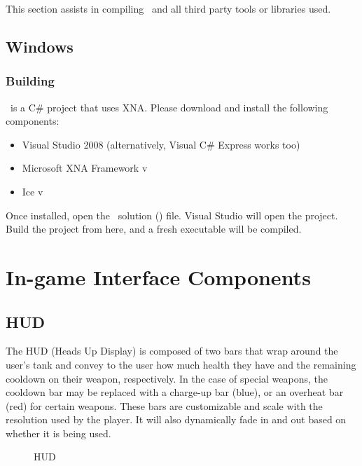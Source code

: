 This section assists in compiling \Client\ and all third party tools or libraries used.

\subsection{Windows}

\subsubsection{Building \Client}

\Client\ is a C\# project that uses XNA. Please download and install the following components:

\begin{itemize}
\item Visual Studio 2008 (alternatively, Visual C\# Express works too)
\item Microsoft XNA Framework v\XNAVersion
\item Ice v\IceVersion
\end{itemize}

Once installed, open the \Client\ solution () file. Visual Studio will open the project. Build the project from here, and a fresh executable will be compiled.


\section{In-game Interface Components}

\subsection{HUD}

The HUD (Heads Up Display) is composed of two bars that wrap around the user's tank and convey to the user how much health they have and the remaining cooldown on their weapon, respectively.  In the case of special weapons, the cooldown bar may be replaced with a charge-up bar (blue), or an overheat bar (red) for certain weapons. These bars are customizable and scale with the resolution used by the player. It will also dynamically fade in and out based on whether it is being used. 

\begin{figure}[htbp]
	\centering
	\caption{HUD}
	\label{fig:hud}
\end{figure}

